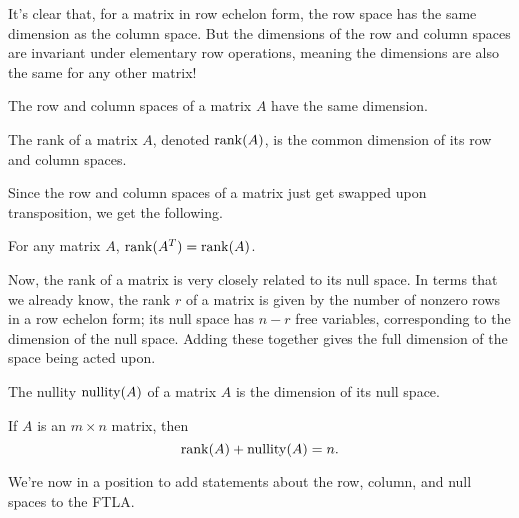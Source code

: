 \documentclass[../m073main.tex]{subfiles}
\begin{document}
It's clear that, for a matrix in row echelon form, the row space has the same dimension as the column space.
But the dimensions of the row and column spaces are invariant under elementary row operations, meaning the dimensions are also the same for any other matrix!

\begin{theorem}
	The row and column spaces of a matrix $A$ have the same dimension.
\end{theorem}

\begin{definition}[Rank]
	The rank of a matrix $A$, denoted $\operatorname{rank}(A)$, is the common dimension of its row and column spaces.
\end{definition}

Since the row and column spaces of a matrix just get swapped upon transposition, we get the following.

\begin{theorem}
	For any matrix $A$, $\operatorname{rank}(A^T) = \operatorname{rank}(A)$.
\end{theorem}

Now, the rank of a matrix is very closely related to its null space.
In terms that we already know, the rank $r$ of a matrix is given by the number of nonzero rows in a row echelon form; its null space has $n-r$ free variables, corresponding to the dimension of the null space.
Adding these together gives the full dimension of the space being acted upon.

\begin{definition}[Nullity]
	The nullity $\operatorname{nullity}(A)$ of a matrix $A$ is the dimension of its null space.
\end{definition}

\begin{theorem}
	If $A$ is an $m\times n$ matrix, then
	\[ \operatorname{rank}(A) + \operatorname{nullity}(A) = n. \]
\end{theorem}

We're now in a position to add statements about the row, column, and null spaces to the FTLA.

\pagebreak
\end{document}
